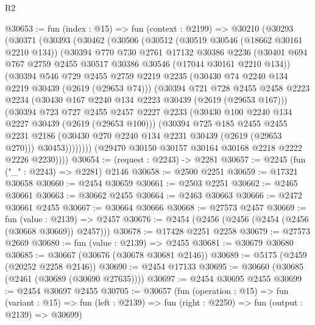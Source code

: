 \begin{lexlean}{R2}
\begin{coremodule}
@30653 := fun (index : @15) =>
  fun (context : @2199) =>
  @30210
    (@30293
      (@30371
        (@30393
          (@30462
            (@30506
              (@30512
                (@30519 @30546 (@18662 @30161 @2210 @134))
                (@30394
                  @770
                  @730
                  @2761
                  @17132
                  @30386
                  @2236
                  (@30401 @694 @767 @2759 @2455 @30517 @30386 @30546 (@17044 @30161 @2210 @134))
                  (@30394
                    @546
                    @729
                    @2455
                    @2759
                    @2219
                    @2235
                    (@30430 @74 @2240 @134 @2219 @30439 (@2619 (@29653 @74)))
                    (@30394
                      @721
                      @728
                      @2455
                      @2458
                      @2223
                      @2234
                      (@30430 @167 @2240 @134 @2223 @30439 (@2619 (@29653 @167)))
                      (@30394
                        @723
                        @727
                        @2455
                        @2457
                        @2227
                        @2233
                        (@30430 @100 @2240 @134 @2227 @30439 (@2619 (@29653 @100)))
                        (@30394
                          @725
                          @185
                          @2455
                          @2455
                          @2231
                          @2186
                          (@30430 @270 @2240 @134 @2231 @30439 (@2619 (@29653 @270)))
                          @30453))))))))
          (@29470 @30150 @30157 @30164 @30168 @2218 @2222 @2226 @2230))))
@30654 := (request : @2243) -> @2281
@30657 := @2245 (fun ("_" : @2243) => @2281) @2146
@30658 := @2500 @2251
@30659 := @17321 @30658
@30660 := @2454 @30659
@30661 := @2503 @2251
@30662 := @2465 @30661
@30663 := @30662 @2455
@30664 := @2463 @30663
@30666 := @2472 @30661 @2455
@30667 := @30664 @30666
@30668 := @27573 @2457
@30669 := fun (value : @2139) => @2457
@30676 := @2454 (@2456 (@2456 (@2454 (@2456 (@30668 @30669)) @2457)))
@30678 := @17428 @2251 @2258
@30679 := @27573 @2669
@30680 := fun (value : @2139) => @2455
@30681 := @30679 @30680
@30685 := @30667 (@30676 (@30678 @30681 @2146))
@30689 := @5175 (@2459 (@20252 @2258 @2146))
@30690 := @2454 @17133
@30695 := @30660 (@30685 (@2461 (@30689 (@30690 @27635))))
@30697 := @2454 @30695 @2455
@30699 := @2454 @30697 @2455
@30705 := @30657
    (fun (operation : @15) =>
    fun (variant : @15) =>
    fun (left : @2139) => fun (right : @2250) => fun (output : @2139) => @30699)

\end{coremodule}
\end{lexlean}

